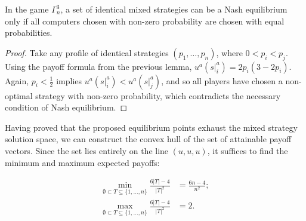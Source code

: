 \begin{lemma}
	In the game $\Gamma^3_n$, a set of identical mixed strategies can be a Nash equilibrium only if all computers chosen with non-zero probability are chosen with equal probabilities. %
\end{lemma}

\begin{proof}
	Take any profile of identical strategies $(p_1, \ldots, p_n)$, where $0 < p_i < p_j$. Using the payoff formula from the previous lemma, $u^a(\left. s \right|^a_i) = 2 p_i (3 - 2 p_i)$. Again, $p_i < \frac{1}{2}$ implies $u^a(\left. s \right|^a_i) < u^a(\left. s \right|^a_j)$, and so all players have chosen a non-optimal strategy with non-zero probability, which contradicts the necessary condition of Nash equilibrium. %
\end{proof}

Having proved that the proposed equilibrium points exhaust the mixed strategy solution space, we can construct the convex hull of the set of attainable payoff vectors. Since the set lies entirely on the line $(u, u, u)$, it suffices to find the minimum and maximum expected payoffs: %

\begin{align*}
	\min_{\emptyset \subset T \subseteq \{1,\ldots,n\}} \frac{6 \left| T \right| - 4}{\left| T \right|^2} &= \frac{6 n - 4}{n^2};\\
	\max_{\emptyset \subset T \subseteq \{1,\ldots,n\}} \frac{6 \left| T \right| - 4}{\left| T \right|^2} &= 2.
\end{align*}

